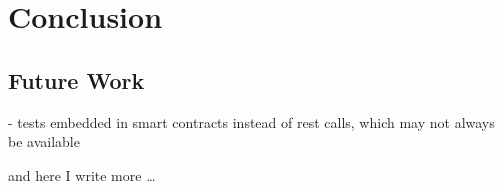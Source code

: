 \chapter{Conclusion}

\section{Future Work}

- tests embedded in smart contracts instead of rest calls, which may not always be available

and here I write more \dots
